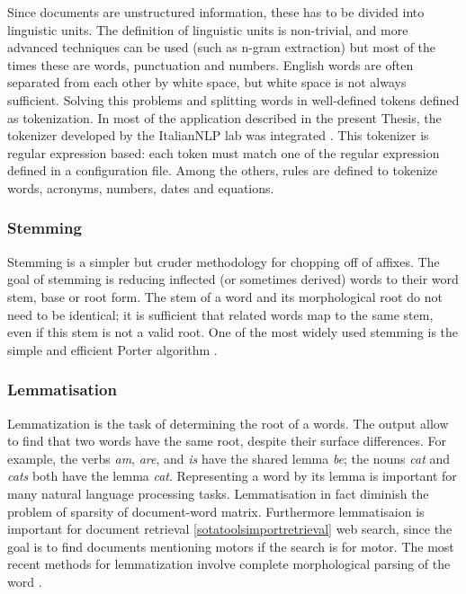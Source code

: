 \documentclass[]{book}
\begin{document}
Since documents are unstructured information, these has to be divided
into linguistic units. The definition of linguistic units is
non-trivial, and more advanced techniques can be used (such as n-gram
extraction) but most of the times these are words, punctuation and
numbers. English words are often separated from each other by white
space, but white space is not always sufficient. Solving this problems
and splitting words in well-defined tokens defined as tokenization. In
most of the application described in the present Thesis, the tokenizer
developed by the ItalianNLP lab was integrated
\citep{dell2009ensemble, attardi2009reverse, attardi2009accurate}. This
tokenizer is regular expression based: each token must match one of the
regular expression defined in a configuration file. Among the others,
rules are defined to tokenize words, acronyms, numbers, dates and
equations.

\subsubsection{Stemming}\label{sotatoolstransformstemming}

Stemming is a simpler but cruder methodology for chopping off of
affixes. The goal of stemming is reducing inflected (or sometimes
derived) words to their word stem, base or root form. The stem of a word
and its morphological root do not need to be identical; it is sufficient
that related words map to the same stem, even if this stem is not a
valid root. One of the most widely used stemming is the simple and
efficient Porter algorithm \citep{porter1980algorithm}.

\subsubsection{Lemmatisation}\label{sotatoolstransformlemmatisation}

Lemmatization is the task of determining the root of a words. The output
allow to find that two words have the same root, despite their surface
differences. For example, the verbs \emph{am}, \emph{are}, and \emph{is}
have the shared lemma \emph{be}; the nouns \emph{cat} and \emph{cats}
both have the lemma \emph{cat}. Representing a word by its lemma is
important for many natural language processing tasks. Lemmatisation in
fact diminish the problem of sparsity of document-word matrix.
Furthermore lemmatisaion is important for document retrieval
\ref{sotatoolsimportretrieval} web search, since the goal is to find
documents mentioning motors if the search is for motor. The most recent
methods for lemmatization involve complete morphological parsing of the
word \citep{hankamer1989morphological}.
\end{document}
